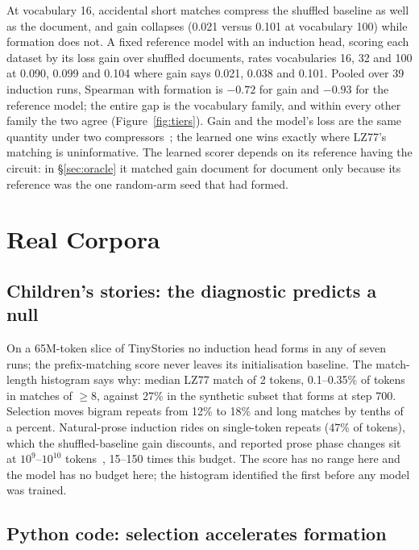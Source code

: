 \documentclass[11pt]{article}
\begin{document}
At vocabulary 16, accidental short matches compress the shuffled baseline
as well as the document, and gain collapses (0.021 versus 0.101 at
vocabulary 100) while formation does not. A fixed reference model with an
induction head, scoring each dataset by its loss gain over shuffled
documents, rates vocabularies 16, 32 and 100 at 0.090, 0.099 and 0.104
where gain says 0.021, 0.038 and 0.101. Pooled over 39 induction runs,
Spearman with formation is $-0.72$ for gain and $-0.93$ for the reference
model; the entire gap is the vocabulary family, and within every other
family the two agree (Figure~\ref{fig:tiers}). Gain and the model's loss
are the same quantity under two compressors~\citep{deletang2023compression};
the learned one wins exactly where LZ77's matching is uninformative. The
learned scorer depends on its reference having the circuit: in
\S\ref{sec:oracle} it matched gain document for document only because its
reference was the one random-arm seed that had formed.

\section{Real Corpora}\label{sec:real}

\subsection{Children's stories: the diagnostic predicts a null}
\label{sec:tinystories}

On a 65M-token slice of TinyStories no induction head forms in any of seven
runs; the prefix-matching score never leaves its initialisation baseline.
The match-length histogram says why: median LZ77 match of 2 tokens,
0.1--0.35\% of tokens in matches of $\geq8$, against 27\% in the synthetic
subset that forms at step 700. Selection moves bigram repeats from 12\% to
18\% and long matches by tenths of a percent. Natural-prose induction rides
on single-token repeats (47\% of tokens), which the shuffled-baseline gain
discounts, and reported prose phase changes sit at $10^9$--$10^{10}$
tokens~\citep{olsson2022induction}, 15--150 times this budget. The score
has no range here and the model has no budget here; the histogram
identified the first before any model was trained.

\subsection{Python code: selection accelerates formation}
\label{sec:stack}
\end{document}
